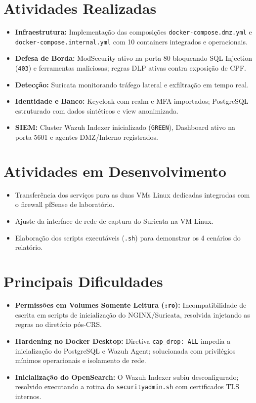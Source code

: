 \documentclass[11pt,a4paper]{article}
\begin{document}
\section{Atividades Realizadas}
\begin{itemize}[noitemsep]
    \item \textbf{Infraestrutura:} Implementação das composições \texttt{docker-compose.dmz.yml} e \texttt{docker-compose.internal.yml} com 10 containers integrados e operacionais.
    \item \textbf{Defesa de Borda:} ModSecurity ativo na porta 80 bloqueando SQL Injection (\texttt{403}) e ferramentas maliciosas; regras DLP ativas contra exposição de CPF.
    \item \textbf{Detecção:} Suricata monitorando tráfego lateral e exfiltração em tempo real.
    \item \textbf{Identidade e Banco:} Keycloak com realm e MFA importados; PostgreSQL estruturado com dados sintéticos e view anonimizada.
    \item \textbf{SIEM:} Cluster Wazuh Indexer inicializado (\texttt{GREEN}), Dashboard ativo na porta 5601 e agentes DMZ/Interno registrados.
\end{itemize}

\section{Atividades em Desenvolvimento}
\begin{itemize}[noitemsep]
    \item Transferência dos serviços para as duas VMs Linux dedicadas integradas com o firewall pfSense de laboratório.
    \item Ajuste da interface de rede de captura do Suricata na VM Linux.
    \item Elaboração dos scripts executáveis (\texttt{.sh}) para demonstrar os 4 cenários do relatório.
\end{itemize}

\section{Principais Dificuldades}
\begin{itemize}[noitemsep]
    \item \textbf{Permissões em Volumes Somente Leitura (\texttt{:ro}):} Incompatibilidade de escrita em scripts de inicialização do NGINX/Suricata, resolvida injetando as regras no diretório pós-CRS.
    \item \textbf{Hardening no Docker Desktop:} Diretiva \texttt{cap\_drop: ALL} impedia a inicialização do PostgreSQL e Wazuh Agent; solucionada com privilégios mínimos operacionais e isolamento de rede.
    \item \textbf{Inicialização do OpenSearch:} O Wazuh Indexer subiu desconfigurado; resolvido executando a rotina do \texttt{securityadmin.sh} com certificados TLS internos.
\end{itemize}
\end{document}
